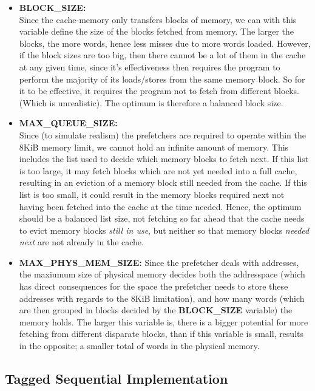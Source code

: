 \begin{itemize}
	\item \textbf{BLOCK\_SIZE:} \\
		Since the cache-memory only transfers blocks of memory, we can with this
		variable define the size of the blocks fetched from memory. The larger
		the blocks, the more words, hence less misses due to more words loaded.
		However, if the block sizes are too big, then there cannot be a lot of
		them in the cache at any given time, since it's effectiveness then
		requires the program to perform the majority of its loads/stores from
		the same memory block. So for it to be effective, it requires the
		program not to fetch from different blocks. (Which is unrealistic). The
		optimum is therefore a balanced block size.
	\item \textbf{MAX\_QUEUE\_SIZE:} \\
		Since (to simulate realism) the prefetchers are required to operate
		within the 8KiB memory limit, we cannot hold an infinite amount of
		memory. This includes the list used to decide which memory blocks to
		fetch next. If this list is too large, it may fetch blocks which are not
		yet needed into a full cache, resulting in an eviction of a memory block
		still needed from the cache. If this list is too small, it could result
		in the memory blocks required next not having been fetched into the
		cache at the time needed. Hence, the optimum should be a balanced list
		size, not fetching so far ahead that the cache needs to evict memory
		blocks \textit{still in use}, but neither so that memory blocks
		\textit{needed next} are not already in the cache.
	\item \textbf{MAX\_PHYS\_MEM\_SIZE:}
		Since the prefetcher deals with addresses, the maxiumum size of physical
		memory decides both the addresspace (which has direct consequences for
		the space the prefetcher needs to store these addresses with regards to
		the 8KiB limitation), and how many words (which are then grouped in
		blocks decided by the \textbf{BLOCK\_SIZE} variable) the memory holds.
		The larger this variable is, there is a bigger potential for more
		fetching from different disparate blocks, than if this variable is
		small, results in the opposite; a smaller total of words in the physical
		memory.
\end{itemize}

\subsection{Tagged Sequential Implementation}

